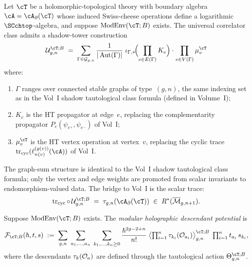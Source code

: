 \begin{conjecture}
\label{conj:correlator-from-shadow-tower}
Let $\cT$ be a holomorphic-topological theory with boundary algebra
$\cA = \cA_\partial(\cT)$ whose induced Swiss-cheese operations
define a logarithmic $\SCchtop$-algebra, and suppose
$\ModEnv(\cT;B)$ exists. The universal correlator class admits a
shadow-tower construction
\begin{equation}\label{eq:correlator-from-shadow-tower}
\mathcal{U}_{g,n}^{\cT;B}
\;=\;
\sum_{\Gamma \in \mathcal{G}_{g,n}}
\frac{1}{|\operatorname{Aut}(\Gamma)|}
\;\iota_{\Gamma,*}\!\Bigl(
 \prod_{e \in E(\Gamma)} K_e
\Bigr)
\cdot
\prod_{v \in V(\Gamma)} \mu_v^{\cT}
\end{equation}
where:
\begin{enumerate}[label=\textup{(\roman*)}]
\item $\Gamma$ ranges over connected stable graphs of type~$(g,n)$,
 the same indexing set as in the Vol~I shadow tautological class
 formula
 \textup{(}defined in Volume~I\textup{)};
\item $K_e$ is the HT propagator at edge~$e$, replacing the
 complementarity propagator $P_e(\psi_{e^+},\psi_{e^-})$ of Vol~I;
\item $\mu_v^{\cT}$ is the HT vertex operation at vertex~$v$,
 replacing the cyclic trace
 $\operatorname{tr}_{\mathrm{cyc}}(\ell_{n(v)}^{(g(v))}(\cA))$
 of Vol~I.
\end{enumerate}
The graph-sum structure is identical to the Vol~I shadow
tautological class formula; only the vertex and edge weights
are promoted from scalar invariants to endomorphism-valued data.
The bridge to Vol~I is the scalar trace:
\[
\operatorname{tr}_{\mathrm{cyc}} \circ\,
\mathcal{U}_{g,n}^{\cT;B}
\;=\;
\tau_{g,n}(\cA_\partial(\cT))
\;\in\; R^*(\overline{\mathcal{M}}_{g,n+1}).
\]
\end{conjecture}

\begin{definition}
\label{def:descendant-potential}
Suppose $\ModEnv(\cT;B)$ exists. The \emph{modular holographic descendant potential} is
\[
\mathcal{F}_{\cT;B}(\hbar,t,s)
\;:=\;
\sum_{g,n}\;\sum_{a_1,\dots,a_n}\;\sum_{k_1,\dots,k_n\ge 0}
\frac{\hbar^{2g-2+n}}{n!}\;
\bigl\langle
 \textstyle\prod_{i=1}^{n}\tau_{k_i}(\cO_{a_i})
\bigr\rangle_{g,n}^{\cT;B}\;
\prod_{i=1}^{n} t_{a_i}\,s_{k_i},
\]
where the descendants
$\tau_{k}(\mathcal O_{a})$ are defined through the tautological action
$\Theta_{g,n}^{\cT;B}$.
\end{definition}

